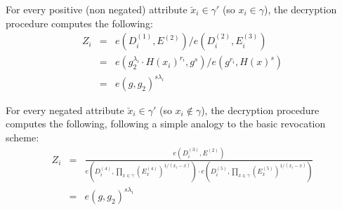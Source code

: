 \documentclass[a4paper, 11pt]{article}
\theoremstyle{definition}
\newcommand{\ID}{\ensuremath{\textrm{ID}}}
\begin{document}
For every positive (non negated) attribute $\breve{x}_i \in \gamma'$
(so $x_i \in \gamma$), the decryption procedure computes the following:
\begin{eqnarray*}
Z_i &=& e\left(D^{(1)}_i, E^{(2)}\right) / e\left(D^{(2)}_i, E^{(3)}_i\right)\\
&=& e\left(g_2^{\lambda_i} \cdot H(x_i)^{r_i}, g^s\right) /
e\left(g^{r_i}, H(x)^s\right) \\
&=& e\left(g,g_2\right)^{s \lambda_i}
\end{eqnarray*}

For every negated attribute $\breve{x}_i \in \gamma'$
(so $x_i \notin \gamma$), the decryption procedure computes the following, following a simple analogy to the basic revocation scheme:
%
%
\begin{eqnarray*}
Z_i &=&
\frac{e\left(D^{(3)}_i, E^{(2)}\right)}
{
e\left(D^{(4)}_i,
\prod_{x \in \gamma} \left(E^{(4)}_x\right)^{1/(x_i-x)}\right)
\cdot
e\left(D^{(5)}_i,
\prod_{x \in \gamma} \left(E^{(5)}_x\right)^{1/(x_i-x)}\right)
} \\
&=&
e\left(g,g_2\right)^{s \lambda_i}
\end{eqnarray*}
\end{document}
